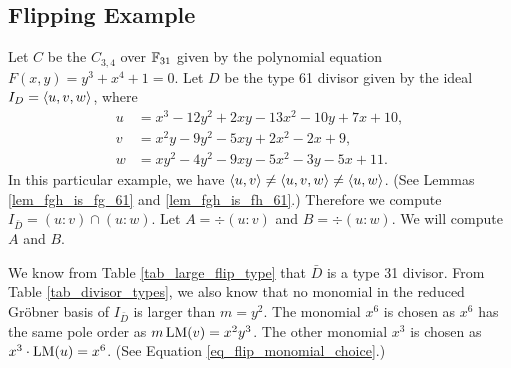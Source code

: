 
\subsection{Flipping Example}
\label{sec_flipping_example}

Let $C$ be the $C_{3,4}$ over $\mathbb{F}_{31}$ given by the polynomial equation $F(x,y) = y^3 + x^4 + 1 = 0$.
Let $D$ be the type 61 divisor given by the ideal $I_D = \left\langle u,v,w \right\rangle$, where
\begin{align*}
  u &=  x^3 - 12y^2 + 2xy - 13x^2 - 10y + 7x + 10, \\
  v &= x^2y -  9y^2 - 5xy +  2x^2 -  2x      +  9, \\
  w &= xy^2 -  4y^2 - 9xy -  5x^2 -  3y - 5x + 11.
\end{align*}
In this particular example, we have $\left\langle u,v \right\rangle \neq \left\langle u,v,w \right\rangle \neq \left\langle u,w \right\rangle$.
(See Lemmas \ref{lem_fgh_is_fg_61} and \ref{lem_fgh_is_fh_61}.)
Therefore we compute $I_{\bar D} = (u : v) \cap (u : w)$.
Let $A = \div(u : v)$ and $B = \div(u : w)$.
We will compute $A$ and $B$.

We know from Table \ref{tab_large_flip_type} that $\bar D$ is a type 31 divisor.
From Table \ref{tab_divisor_types},
we also know that no monomial in the reduced Gr\"obner basis of $I_{\bar D}$ is larger than $m = y^2$.
The monomial $x^6$ is chosen as $x^6$ has the same pole order as $m\operatorname{LM}(v) = x^2y^3$.
The other monomial $x^3$ is chosen as $x^3\cdot\operatorname{LM}(u) = x^6$.
(See Equation \ref{eq_flip_monomial_choice}.)

